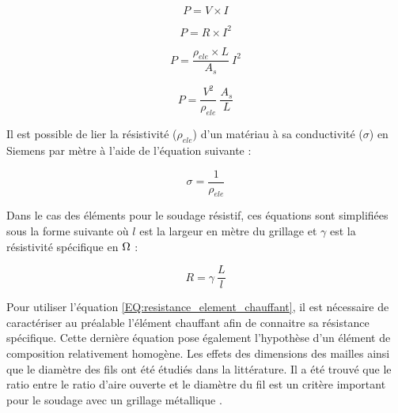 \begin{equation}
P = V \times I
\end{equation}

\begin{equation}
P = R \times I^2
\end{equation}

\begin{equation}
P = \frac{\rho_{ele} \times L}{A_s} \ I^2
\end{equation}

\begin{equation}
P = \frac{V^2}{\rho_{ele}} \ \frac{A_s}{L}
\end{equation}

Il est possible de lier la résistivité ($\rho_{ele}$) d'un matériau à sa conductivité ($\sigma$) en Siemens par mètre à l'aide de l'équation suivante :

\begin{equation}
\sigma = \frac{1}{\rho_{ele}}
\end{equation}

Dans le cas des éléments pour le soudage résistif, ces équations sont simplifiées sous la forme suivante où $l$ est la largeur en mètre du grillage et $\gamma$ est la résistivité spécifique en $\ohm$ :

\begin{equation}
R = \gamma \ \frac{L}{l}
\label{EQ:resistance_element_chauffant}
\end{equation}

Pour utiliser l'équation \ref{EQ:resistance_element_chauffant}, il est nécessaire de caractériser au préalable l'élément chauffant afin de connaitre sa résistance spécifique. 
Cette dernière équation pose également l'hypothèse d'un élément de composition relativement homogène. 
Les effets des dimensions des mailles ainsi que le diamètre des fils ont été étudiés dans la littérature.
Il a été trouvé que le ratio entre le ratio d'aire ouverte et le diamètre du fil est un critère important pour le soudage avec un grillage métallique \cite{Dube2012a}. 

